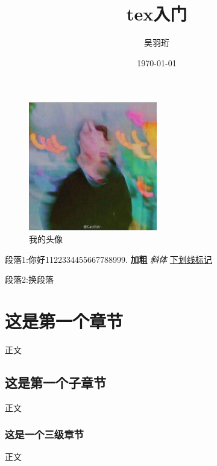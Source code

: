 \documentclass[UTF8]{ctexart}
\title{tex入门}
\author{吴羽珩}
\date{\today}
\begin{document}
\maketitle


\begin{figure}[H]
    \centering%
    \includegraphics[width=0.5\textwidth]{x}
    \caption{我的头像}
\end{figure}



段落1:你好1122334455667788999.
\textbf{加粗}
\textit{斜体}
\underline{下划线标记}

段落2:换段落


\section{这是第一个章节}
正文
\subsection{这是第一个子章节}
正文
\subsubsection{这是一个三级章节}
正文
\end{document}
